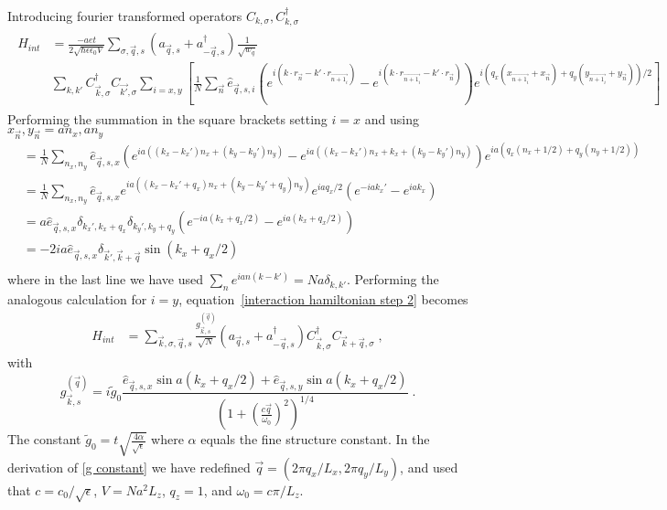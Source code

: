 \documentclass{article}
\begin{document}
Introducing fourier transformed operators $C_{k,\sigma} , C_{k,\sigma}^{\dagger}$
\begin{align*}
    \begin{split}
    H_{int} &= \frac{-aet}{2\sqrt{\hbar \epsilon \epsilon_0 V} } \sum_{\sigma,\vec{q},s} \left(a_{\vec{q},s} + a_{-\vec{q}, s}^{\dagger}\right) \frac{1}{\sqrt{w_q}} \\ 
            & \sum_{k,k'}   C_{\vec{k},\sigma}^{\dagger} C_{\vec{k'},\sigma} \sum_{i=x,y} \left[\frac{1}{N}\sum_{\vec{n}} \hat{e}_{\vec{q},s,i} ( e^{i\left(k \cdot r_{\vec{n}} - k' \cdot r_{\vec{n+1_i}} \right)} - e^{i\left(k \cdot r_{\vec{n+1_i}} - k' \cdot r_{\vec{n}} \right)}) e^{i\left(q_x \left(x_{\vec{n + 1_i}} + x_{\vec{n}} \right) + q_y \left(y_{\vec{n + 1_i}} + y_{\vec{n}} \right)\right)/2}\right]
    \end{split}
    \label{interaction hamiltonian step 2}
\end{align*}
Performing the summation in the square brackets setting $i = x$ and using $x_{\vec{n}},y_{\vec{n}} = a n_x, a n_y$
\begin{align*}
    [...] &= \frac{1}{N}\sum_{n_x, n_y} \hat{e}_{\vec{q},s,x} ( e^{i a\left((k_x - k_x') n_x + (k_y - k_y') n_y \right)} -  e^{i a\left((k_x - k_x') n_x + k_x + (k_y - k_y') n_y \right)}) e^{i a \left(q_x \left(n_x + 1/2\right) + q_y (n_y + 1/2)\right)}\\
          &= \frac{1}{N}\sum_{n_x, n_y} \hat{e}_{\vec{q},s,x} e^{i a\left((k_x - k_x' + q_x) n_x + (k_y - k_y' + q_y) n_y \right)} e^{ia q_x / 2} ( e^{- i a k_x' } -  e^{i a k_x })\\
          &= a \hat{e}_{\vec{q},s,x} \delta_{k_x',k_x + q_x} \delta_{k_y',k_y + q_y}  ( e^{- i a (k_x + q_x /2) } -  e^{i a (k_x + q_x/2)  })\\
          &=   -2 i a \hat{e}_{\vec{q},s,x} \delta_{\vec{k}',\vec{k} + \vec{q}} \sin(k_x + q_x /2)\\
\end{align*}
where in the last line we have used $\sum_n e^{ian(k - k')} = N a \delta_{k,k'}$. Performing the analogous calculation for $i = y$, equation~\cref{interaction hamiltonian step 2} becomes
\begin{align}
    H_{int} &=  \sum_{\vec{k},\sigma,\vec{q},s} \frac{g_{\vec{k},s}^{(\vec{q})}}{\sqrt{N}} \left(a_{\vec{q},s} + a_{-\vec{q}, s}^{\dagger}\right) C_{\vec{k},\sigma}^{\dagger} C_{\vec{k} + \vec{q},\sigma} \;,
\end{align}
with 
\begin{equation}
   g_{\vec{k},s}^{(\vec{q})} = i \tilde{g}_0 \frac{\hat{e}_{\vec{q},s,x} \sin{a(k_x + q_x /2)} + \hat{e}_{\vec{q},s,y} \sin{a(k_x + q_x /2)}}{\left(1 + \left(\frac{c\vec{q}}{\omega_0}\right)^2\right)^{1/4}}\;.
   \label{g constant}
\end{equation}
The constant $\tilde{g}_0 = t\sqrt{\frac{4 \alpha}{\sqrt{\epsilon}}}$ where $\alpha$ equals the fine structure constant. In the derivation of \cref{g constant} we have redefined $\vec{q} = (2\pi q_x / L_x, 2\pi q_y / L_y) $, and used that  $c = c_0 / \sqrt{\epsilon}$, $V = N a^2 L_z$, $q_z = 1$,  and $\omega_0 = c\pi / L_z$.
\end{document}
